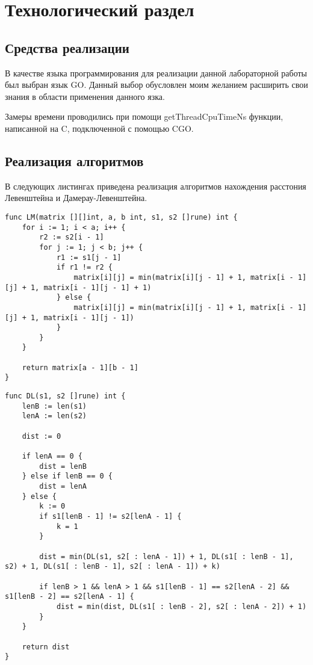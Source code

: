 \chapter{Технологический раздел}

\section{Средства реализации}

В качестве языка программирования для реализации данной лабораторной работы был выбран язык GO\cite{go}. Данный
выбор обусловлен моим желанием расширить свои знания в области применения данного язка.

Замеры времени проводились при помощи getThreadCpuTimeNs функции, написанной на C, 
подключенной с помощью CGO.\cite{cgo}

\section{Реализация алгоритмов}
В следующих листингах приведена реализация алгоритмов нахождения расстония Левенштейна и Дамерау-Левенштейна.

\begin{lstlisting}[label=lst:LM,caption=Функция нахождения расстояния Левенштейна нерекурсивным способом]
func LM(matrix [][]int, a, b int, s1, s2 []rune) int { 
	for i := 1; i < a; i++ {
		r2 := s2[i - 1]
		for j := 1; j < b; j++ {
			r1 := s1[j - 1]
			if r1 != r2 {
				matrix[i][j] = min(matrix[i][j - 1] + 1, matrix[i - 1][j] + 1, matrix[i - 1][j - 1] + 1)
			} else {
				matrix[i][j] = min(matrix[i][j - 1] + 1, matrix[i - 1][j] + 1, matrix[i - 1][j - 1])
			}
		}
	}

	return matrix[a - 1][b - 1]
}
\end{lstlisting}

\clearpage

\begin{lstlisting}[label=lst:DL,caption=Функция нахождения расстояния Левенштейна-Дамерау с помощью рекурсии]
func DL(s1, s2 []rune) int {
    lenB := len(s1)
    lenA := len(s2)

    dist := 0 

    if lenA == 0 {
        dist = lenB
    } else if lenB == 0 {
        dist = lenA
    } else {
        k := 0
        if s1[lenB - 1] != s2[lenA - 1] {
            k = 1
        }	

        dist = min(DL(s1, s2[ : lenA - 1]) + 1, DL(s1[ : lenB - 1], s2) + 1, DL(s1[ : lenB - 1], s2[ : lenA - 1]) + k)

        if lenB > 1 && lenA > 1 && s1[lenB - 1] == s2[lenA - 2] && s1[lenB - 2] == s2[lenA - 1] {
            dist = min(dist, DL(s1[ : lenB - 2], s2[ : lenA - 2]) + 1)
        }
    }

    return dist
}
\end{lstlisting}


